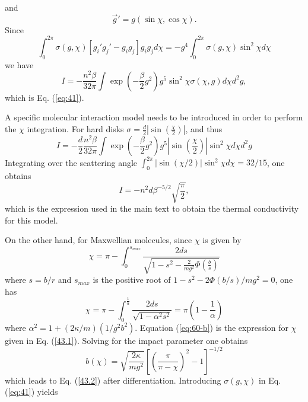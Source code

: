 \documentclass[11pt]{article} %
\begin{document}
and 
\begin{equation}
\vec{g}'=g\left(\sin\chi,\cos\chi\right).\label{55}
\end{equation}
Since 
\begin{equation}
\int_{0}^{2\pi}\sigma\left(g,\chi\right)\left[g_{i}'g_{j}'-g_{i}g_{j}\right]g_{i}g_{j}d\chi=-g^{4}\int_{0}^{2\pi}\sigma\left(g,\chi\right)\sin^{2}\chi d\chi\label{eq:56-b}
\end{equation}
we have 
\begin{equation}
I=-\frac{n^{2}\beta}{32\pi}\int\exp\left(-\frac{\beta}{2}g^{2}\right)g^{5}\sin^{2}\chi\sigma\left(\chi,g\right)d\chi d^{2}g,\label{53-2}
\end{equation}
which is Eq. (\ref{eq:41}).

A specific molecular interaction model needs to be introduced in order
to perform the $\chi$ integration. For hard disks $\sigma=\frac{d}{2}\left|\sin\left(\frac{\chi}{2}\right)\right|$,
and thus 
\begin{equation}
I=-\frac{d}{2}\frac{n^{2}\beta}{32\pi}\int\exp\left(-\frac{\beta}{2}g^{2}\right)g^{5}\left|\sin\left(\frac{\chi}{2}\right)\right|\sin^{2}\chi d\chi d^{2}g\label{eq:57-b}
\end{equation}
Integrating over the scattering angle $\int_{0}^{2\pi}\left|\sin\left(\chi/2\right)\right|\sin^{2}\chi d\chi=32/15$,
one obtains 
\begin{equation}
I=-n^{2}d\beta^{-5/2}\sqrt{\frac{\pi}{2}},\label{eq:58-b}
\end{equation}
which is the expression used in the main text to obtain the thermal
conductivity for this model.

On the other hand, for Maxwellian molecules, since $\chi$ is given
by 
\begin{equation}
\chi=\pi-\int_{0}^{s_{max}}\frac{2ds}{\sqrt{1-s^{2}-\frac{2}{mg^{2}}\Phi\left(\frac{b}{s}\right)}}\label{eq:59-b}
\end{equation}
where $s=b/r$ and $s_{max}$ is the positive root of $1-s^{2}-2\Phi\left(b/s\right)/mg^2=0$,
one has 
\begin{equation}
\chi=\pi-\int_{0}^{\frac{1}{\alpha}}\frac{2ds}{\sqrt{1-\alpha^{2}s^{2}}}=\pi\left(1-\frac{1}{\alpha}\right)\label{eq:60-b}
\end{equation}
where $\alpha^{2}=1+\left(2\kappa/m\right)\left(1/g^{2}b^{2}\right)$.
Equation (\ref{eq:60-b}) is the expression for $\chi$ given in Eq.
(\ref{43.1}). Solving for the impact parameter one obtains 
\begin{equation}
b\left(\chi\right)=\sqrt{\frac{2\kappa}{mg^2}}\left[\left(\frac{\pi}{\pi-\chi}\right)^{2}-1\right]^{-1/2}\label{eq:67-b-1}
\end{equation}
which leads to Eq. (\ref{43.2}) after differentiation. Introducing
$\sigma\left(g,\chi\right)$ in Eq. (\ref{eq:41}) yields
\end{document}
